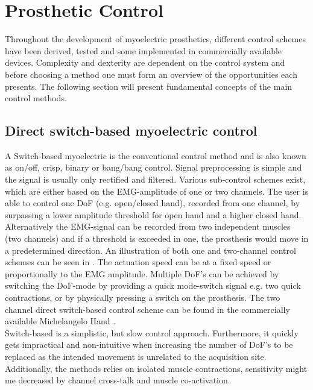 \section{Prosthetic Control}

Throughout the development of myoelectric prosthetics, different control schemes have been derived, tested and some implemented in commercially available devices. Complexity and dexterity are dependent on the control system and before choosing a method one must form an overview of the opportunities each presents. The following section will present fundamental concepts of the main control methods. 
 
\subsection{Direct switch-based myoelectric control}
A Switch-based myoelectric is the conventional control method and is also known as on/off, crisp, binary or bang/bang control. \cite{Geethanjali2016}
Signal preprocessing is simple and the signal is usually only rectified and filtered. Various sub-control schemes exist, which are either based on the EMG-amplitude of one or two channels. The user is able to control one DoF (e.g. open/closed hand), recorded from one channel, by surpassing a lower amplitude threshold for open hand and a higher closed hand. Alternatively the EMG-signal can be recorded from two independent muscles (two channels) and if a threshold is exceeded in one, the prosthesis would move in a predetermined direction. An illustration of both one and two-channel control schemes can be seen in . The actuation speed can be at a fixed speed or proportionally to the EMG amplitude. Multiple DoF's can be achieved by switching the DoF-mode by providing a quick mode-switch signal e.g. two quick contractions, or by physically pressing a switch on the prosthesis. \cite{Farina2014,Wurth2014}  The two channel direct switch-based control scheme can be found in the commercially available Michelangelo Hand \cite{Ottobuck2019}. \\  Switch-based is a simplistic, but slow  control approach. Furthermore, it quickly gets impractical and non-intuitive when increasing the number of DoF's to be replaced as the intended movement is unrelated to the acquisition site. Additionally, the methods relies on isolated muscle contractions, sensitivity might me decreased by channel cross-talk and muscle co-activation. \cite{Wurth2014}    
   
